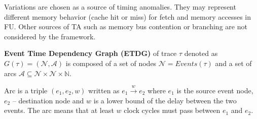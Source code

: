 Variations are chosen as a source of timing anomalies. They may represent different memory behavior (cache hit or miss) for fetch and memory accesses in FU. Other sources of TA such as memory bus contention or branching are not considered by the framework.

\textbf{Event Time Dependency Graph (ETDG)} of trace $\tau$ denoted as $G(\tau) = (\mathcal{N}, \mathcal{A})$ is composed of a set of nodes $\mathcal{N} = Events(\tau)$ and a set of arcs $\mathcal{A} \subseteq \mathcal{N} \times \mathcal{N} \times \mathbb{N}$. 


Arc is a triple $(e_1, e_2, w)$ written as $e_1 \xrightarrow{w} e_2$ where $e_1$ is the source event node, $e_2$ -- destination node and $w$ is a lower bound of the delay between the two events. The arc means that at least $w$ clock cycles must pass between $e_1$ and $e_2$. 

